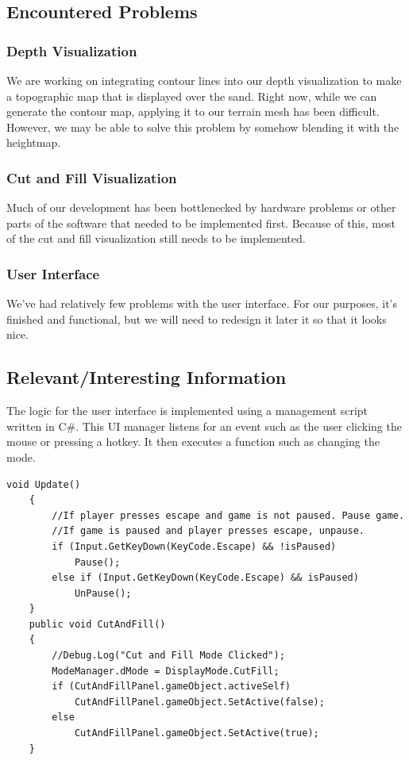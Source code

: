 \documentclass[onecolumn, draftclsnofoot,10pt, compsoc]{IEEEtran}
\begin{document}
\subsection{Encountered Problems}

\subsubsection{Depth Visualization}
We are working on integrating contour lines into our depth visualization to make a topographic map that is displayed over the sand.
Right now, while we can generate the contour map, applying it to our terrain mesh has been difficult.
However, we may be able to solve this problem by somehow blending it with the heightmap.

\subsubsection{Cut and Fill Visualization}
Much of our development has been bottlenecked by hardware problems or other parts of the software that needed to be implemented first.
Because of this, most of the cut and fill visualization still needs to be implemented.

\subsubsection{User Interface}
We've had relatively few problems with the user interface.
For our purposes, it's finished and functional, but we will need to redesign it later it so that it looks nice.

\subsection{Relevant/Interesting Information}
The logic for the user interface is implemented using a management script written in C\#.
This UI manager listens for an event such as the user clicking the mouse or pressing a hotkey.
It then executes a function such as changing the mode.
\\
\begin{lstlisting}[caption=Above is a code snippet from the UI manager demonstrating how the UI works., label=lst:UI,captionpos=b]
    void Update()
    {
        //If player presses escape and game is not paused. Pause game. 
        //If game is paused and player presses escape, unpause.
        if (Input.GetKeyDown(KeyCode.Escape) && !isPaused)
            Pause();
        else if (Input.GetKeyDown(KeyCode.Escape) && isPaused)
            UnPause();
    }
    public void CutAndFill()
    {
        //Debug.Log("Cut and Fill Mode Clicked");
        ModeManager.dMode = DisplayMode.CutFill;
        if (CutAndFillPanel.gameObject.activeSelf)
            CutAndFillPanel.gameObject.SetActive(false);
        else
            CutAndFillPanel.gameObject.SetActive(true);
    }
\end{lstlisting}
\end{document}
